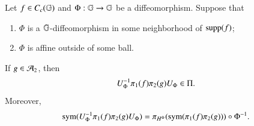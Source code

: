 \documentclass[leqno]{amsart}
\begin{document}
	
	\begin{lemma}\label{ufginclusion}
		Let $f\in C_{c}(\mathbb{G})$ and $\Phi:\mathbb{G}\rightarrow \mathbb{G}$ be a diffeomorphism.
		Suppose that 
		\begin{enumerate}
			\item $\Phi$ is a $\mathbb{G}$-diffeomorphism in some neighborhood of ${\rm supp}(f)$;
			
			\item $\Phi$ is affine outside of some ball. 
		\end{enumerate}
		If $g\in{\mathcal A}_{2}$, then
		\begin{align*}
			U_{\Phi}^{-1} \pi_{1}(f)\pi_{2}(g)U_{\Phi}\in\Pi.
		\end{align*}
		Moreover,
		\begin{align*}
			{\rm sym}(U_{\Phi}^{-1} \pi_{1}(f)\pi_{2}(g)U_{\Phi})=\pi_{H^{\Phi}}({\rm sym}(\pi_{1}(f)\pi_{2}(g)))\circ\Phi^{-1}.
		\end{align*}
	\end{lemma}
\end{document}
